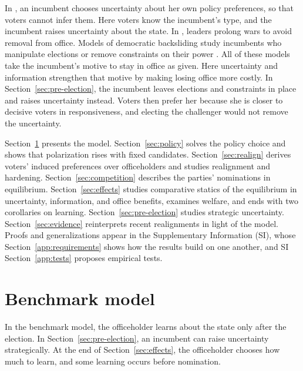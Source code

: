 \documentclass[12pt,letterpaper]{article}
\begin{document}
In \citet{AlesinaCukierman1990}, an incumbent chooses uncertainty about her own policy preferences, so that voters cannot infer them. Here voters know the incumbent's type, and the incumbent raises uncertainty about the state. In \citet{DownsRocke1994}, leaders prolong wars to avoid removal from office. Models of democratic backsliding study incumbents who manipulate elections \citep{GrattonLee2024,HelmkeKroegerPaine2022,LuoPrzeworski2023} or remove constraints on their power \citep{HowellShepsleWolton2023,GrilloPrato2023,ChioprisNalepaVanberg2025}. All of these models take the incumbent's motive to stay in office as given. Here uncertainty and information strengthen that motive by making losing office more costly. In Section~\ref{sec:pre-election}, the incumbent leaves elections and constraints in place and raises uncertainty instead. Voters then prefer her because she is closer to decisive voters in responsiveness, and electing the challenger would not remove the uncertainty.

Section~\ref{sec:model} presents the model. Section~\ref{sec:policy} solves the policy choice and shows that polarization rises with fixed candidates. Section~\ref{sec:realign} derives voters' induced preferences over officeholders and studies realignment and hardening. Section~\ref{sec:competition} describes the parties' nominations in equilibrium. Section~\ref{sec:effects} studies comparative statics of the equilibrium in uncertainty, information, and office benefits, examines welfare, and ends with two corollaries on learning. Section~\ref{sec:pre-election} studies strategic uncertainty. Section~\ref{sec:evidence} reinterprets recent realignments in light of the model. Proofs and generalizations appear in the Supplementary Information (SI), whose Section~\ref{app:requirements} shows how the results build on one another, and SI Section~\ref{app:tests} proposes empirical tests.

\section{Benchmark model}\label{sec:model}

In the benchmark model, the officeholder learns about the state only after the election. In Section~\ref{sec:pre-election}, an incumbent can raise uncertainty strategically. At the end of Section~\ref{sec:effects}, the officeholder chooses how much to learn, and some learning occurs before nomination.
\end{document}
